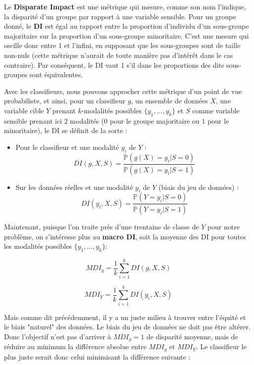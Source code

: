 Le \textbf{Disparate Impact} est une métrique qui mesure, comme son nom l’indique, la disparité d’un groupe par rapport à une variable sensible. Pour un groupe donné, le \textbf{DI} est égal au rapport entre la proportion d’individu d’un sous-groupe majoritaire sur la proportion d’un sous-groupe minoritaire. C’est une mesure qui oscille donc entre 1 et l'infini, en supposant que les sous-groupes sont de taille non-nuls (cette métrique n'aurait de toute manière pas d'intérêt dans le cas contraire). Par conséquent, le DI vaut 1 s’il dans les proportions des dits sous-groupes sont équivalentes.
\newline

Avec les classifieurs, nous pouvons approcher cette métrique d’un point de vue probabiliste, et ainsi, pour un classifieur $g$, un ensemble de données $X$, une variable cible $Y$ prenant $k$-modalités possibles $\{y_1, \dots , y_k\}$ et $S$ comme variable sensible prenant ici 2 modalités ($0$ pour le groupe majoritaire ou $1$ pour le minoritaire), le DI se définit de la sorte :
\newline

\begin{itemize}
\item Pour le classifieur et une modalité $y_i$ de $Y$ :
$$DI(g, X, S) = \frac{\mathbb{P}(g(X) = y_i | S=0)}{\mathbb{P}(g(X) = y_i | S=1)}$$ 

\item Sur les données réelles et une modalité $y_i$ de $Y$ (biais du jeu de données) :
$$DI(y_i, X, S) = \frac{\mathbb{P}(Y = y_i | S=0)}{\mathbb{P}(Y = y_i | S=1)}$$
\end{itemize}

\hfill

Maintenant, puisque l'on traite près d'une trentaine de classe de $Y$ pour notre problème, on s'intéresse plus au \textbf{macro DI}, soit la moyenne des DI pour toutes les modalités possibles $\{y_1, \dots, y_k\} :$

$$
MDI_{g} = \frac{1}{k} \sum_{i=1}^{k} DI(g, X, S)
$$

$$
MDI_{Y} = \frac{1}{k} \sum_{i=1}^{k} DI(y_i, X, S)
$$

Mais comme dit précédemment, il y a un juste milieu à trouver entre l’équité et le biais "naturel" des données. Le biais du jeu de données ne doit pas être altérer. Donc l’objectif n’est pas d’arriver à $MDI_{g} = 1$ de disparité moyenne, mais de réduire au minimum la différence absolue entre $MDI_{g}$ et $MDI_{Y}$. Le classifieur le plus juste serait donc celui minimisant la différence suivante :

